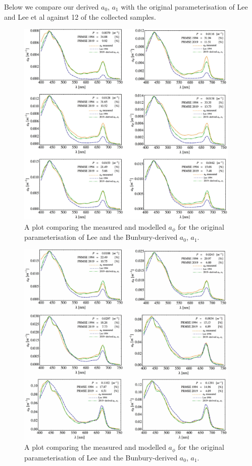 \documentclass[12pt]{article}
\numberwithin{equation}{section}
\begin{document}
Below we compare our derived $a_0$, $a_1$ with the original parameterisation of 
Lee \cite{lee1994} and Lee et al \cite{lee1998} against 12 of the collected samples.

\begin{figure}[H]
\centering
\includegraphics[width=0.95\textwidth]{aphi_plot_1_legend.jpg}
\caption{A plot comparing the measured and modelled $a_\phi$ for the original 
parameterisation of Lee and the Bunbury-derived $a_0$, $a_1$.}
\end{figure}

\begin{figure}[H]
\centering
\includegraphics[width=0.95\textwidth]{aphi_plot_2_legend.jpg}
\caption{A plot comparing the measured and modelled $a_\phi$ for the original 
parameterisation of Lee and the Bunbury-derived $a_0$, $a_1$.}
\end{figure}
\end{document}
